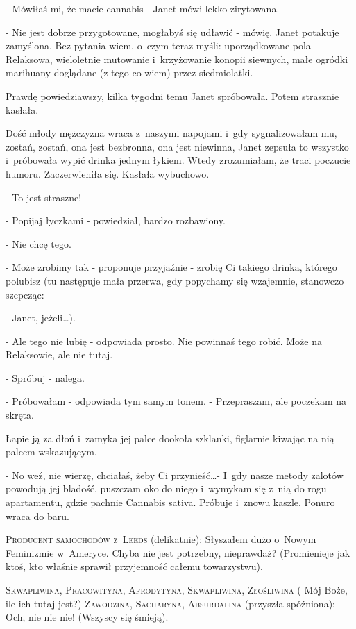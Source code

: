 \documentclass[oneside,polish,12pt,sfheadings]{mwbk}
\begin{document}
- Mówiłaś mi, że macie cannabis - Janet mówi lekko zirytowana.

- Nie jest dobrze przygotowane, mogłabyś się udławić - mówię. Janet
potakuje zamyślona. Bez pytania wiem, o~czym teraz myśli: uporządkowane
pola Relaksowa, wieloletnie mutowanie i~krzyżowanie konopii siewnych,
małe ogródki marihuany doglądane (z tego co wiem) przez siedmiolatki.

Prawdę powiedziawszy, kilka tygodni temu Janet spróbowała. Potem strasznie
kasłała.

Dość młody mężczyzna wraca z~naszymi napojami i~gdy sygnalizowałam
mu, zostań, zostań, ona jest bezbronna, ona jest niewinna, Janet zepsuła
to wszystko i~próbowała wypić drinka jednym łykiem. Wtedy zrozumiałam,
że traci poczucie humoru. Zaczerwieniła się. Kasłała wybuchowo. 

- To jest straszne!

- Popijaj łyczkami - powiedział, bardzo rozbawiony.

- Nie chcę tego.

- Może zrobimy tak - proponuje przyjaźnie - zrobię Ci takiego drinka,
którego polubisz (tu następuje mała przerwa, gdy popychamy się wzajemnie,
stanowczo szepcząc: 

- Janet, jeżeli\ldots).

- Ale tego nie lubię - odpowiada prosto. Nie powinnaś tego robić.
Może na Relaksowie, ale nie tutaj.

- Spróbuj - nalega.

- Próbowałam - odpowiada tym samym tonem. - Przepraszam, ale poczekam
na skręta.

Łapie ją za dłoń i~zamyka jej palce dookoła szklanki, figlarnie kiwając
na nią palcem wskazującym. 

- No weź, nie wierzę, chciałaś, żeby Ci przynieść\ldots - I~gdy nasze metody zalotów powodują jej bladość, puszczam
oko do niego i~wymykam się z~nią do rogu apartamentu, gdzie pachnie
Cannabis sativa. Próbuje i~znowu kaszle. Ponuro wraca do baru.

\textsc{Producent samochodów z~Leeds} (delikatnie): Słyszałem dużo o~Nowym
Feminizmie w~Ameryce. Chyba nie jest potrzebny, nieprawdaż? (Promienieje
jak ktoś, kto właśnie sprawił przyjemność całemu towarzystwu).

\textsc{Skwapliwina, Pracowityna, Afrodytyna, Skwapliwina, Złośliwina} ( Mój
Boże, ile ich tutaj jest?) \textsc{Zawodzina, Sacharyna, Absurdalina} (przyszła
spóźniona): Och, nie nie nie! (Wszyscy się śmieją).
\end{document}
